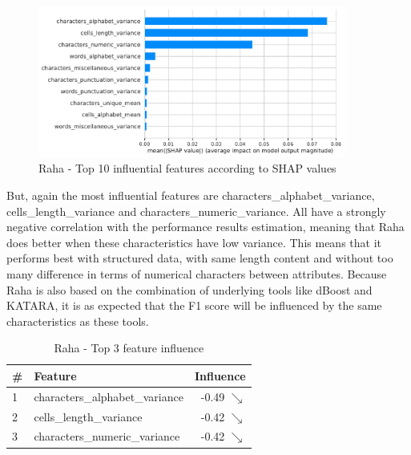 \begin{figure}[H]
    \centering
    \includegraphics[width=0.9\textwidth]{thesis/Figures/RQ4/Shap_cell_f1_Raha.pdf}
    \caption{Raha - Top 10 influential features according to SHAP values}
    \label{fig:most_impact_features_raha}
\end{figure}

But, again the most influential features are characters\_alphabet\_variance, cells\_length\_variance and characters\_numeric\_variance. All have a strongly negative correlation with the performance results estimation, meaning that Raha does better when these characteristics have low variance. This means that it performs best with structured data, with same length content and without too many difference in terms of numerical characters between attributes. Because Raha is also based on the combination of underlying tools like dBoost and KATARA, it is as expected that the F1 score will be influenced by the same characteristics as these tools.

\begin{table}[H]
\centering
\begin{tabular}{llr}
\toprule
 \# &                         Feature &         Influence \\
\midrule
 1 &  characters\_alphabet\_variance &  -0.49 $\searrow$ \\
 2 &         cells\_length\_variance &  -0.42 $\searrow$ \\
 3 &   characters\_numeric\_variance &  -0.42 $\searrow$ \\
\bottomrule
\end{tabular}
\caption{Raha - Top 3 feature influence}
\label{tab:top_influence_features_raha}
\end{table}
